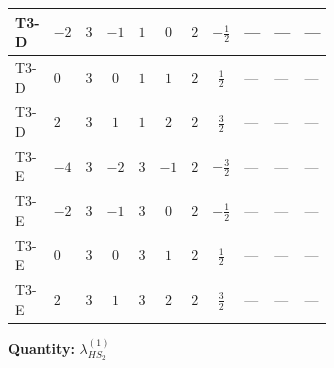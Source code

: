 \documentclass[8pt]{article}
\begin{document}
\begin{landscape}
\begin{longtable}{@{}llcccccc >{\raggedright\arraybackslash}p{0.21\linewidth} >{\raggedright\arraybackslash}p{0.21\linewidth} >{\raggedright\arraybackslash}p{0.21\linewidth}@{}}
\midrule
T3-D & $-2$ & $3$ & $-1$ & $1$ & $0$ & $2$ & $-\frac{1}{2}$ & --- & --- & --- \\
\midrule
T3-D & $0$ & $3$ & $0$ & $1$ & $1$ & $2$ & $\frac{1}{2}$ & --- & --- & --- \\
\midrule
T3-D & $2$ & $3$ & $1$ & $1$ & $2$ & $2$ & $\frac{3}{2}$ & --- & --- & --- \\
\midrule
T3-E & $-4$ & $3$ & $-2$ & $3$ & $-1$ & $2$ & $-\frac{3}{2}$ & --- & --- & --- \\
\midrule
T3-E & $-2$ & $3$ & $-1$ & $3$ & $0$ & $2$ & $-\frac{1}{2}$ & --- & --- & --- \\
\midrule
T3-E & $0$ & $3$ & $0$ & $3$ & $1$ & $2$ & $\frac{1}{2}$ & --- & --- & --- \\
\midrule
T3-E & $2$ & $3$ & $1$ & $3$ & $2$ & $2$ & $\frac{3}{2}$ & --- & --- & --- \\
\midrule
\bottomrule
\end{longtable}
\clearpage
\noindent\textbf{Quantity: }$\lambda_{HS_2}^{(1)}$\par\smallskip

\end{landscape}
\end{document}
